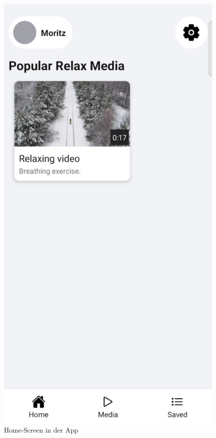\begin{figure}[H]
\begin{minipage}{0.5\textwidth}
    \end{minipage}
    \begin{minipage}{0.5\textwidth}
        \centering
        \includegraphics[height=2\textwidth]{./pics/Home.jpg}
        \caption{Home-Screen in der App}
    \end{minipage}
\end{figure}

